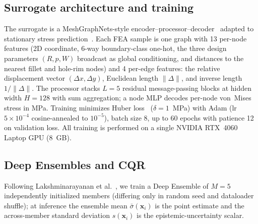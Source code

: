 \documentclass{article}
\begin{document}
\subsection{Surrogate architecture and training}

The surrogate is a MeshGraphNets-style
encoder--processor--decoder~\citep{pfaff2021meshgraphnets} adapted to
stationary stress prediction~\citep{maurizi2022gnn}. Each FEA sample is
one graph with 13 per-node features (2D coordinate, 6-way boundary-class
one-hot, the three design parameters $(R, p, W)$ broadcast as global
conditioning, and distances to the nearest fillet and hole-rim nodes)
and 4 per-edge features: the relative displacement vector
$(\Delta x, \Delta y)$, Euclidean length $\|\Delta\|$, and inverse
length $1/\|\Delta\|$.
The processor stacks $L=5$ residual message-passing blocks at hidden
width $H=128$ with sum aggregation; a node MLP decodes per-node von~Mises
stress in MPa. Training minimizes Huber loss~\citep{huber1964robust} ($\delta=1$~MPa) with Adam
(lr $5\times10^{-4}$ cosine-annealed to $10^{-5}$), batch size $8$, up to
60 epochs with patience 12 on validation loss. All training is performed
on a single NVIDIA RTX~4060 Laptop GPU (8~GB).

\subsection{Deep Ensembles and CQR}

Following Lakshminarayanan et
al.~\citep{lakshminarayanan2017ensembles}, we train a Deep Ensemble of
$M=5$ independently initialized members (differing only in random seed
and dataloader shuffle); at inference the ensemble mean
$\bar{\sigma}(\mathbf{x}_i)$ is the point estimate and the across-member
standard deviation $s(\mathbf{x}_i)$ is the epistemic-uncertainty scalar.
\end{document}
